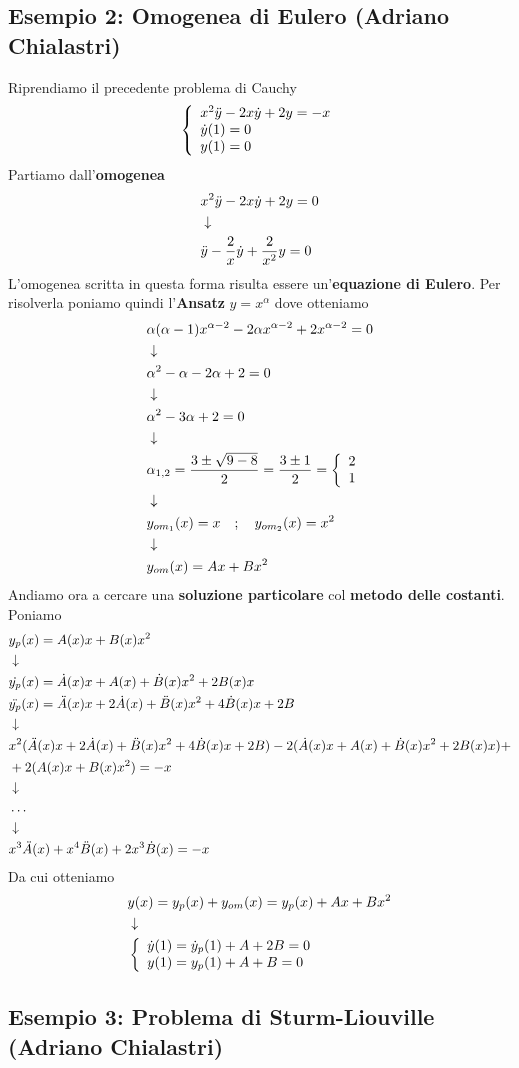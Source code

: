 \subsection{Esempio 2: Omogenea di Eulero (Adriano Chialastri)}
Riprendiamo il precedente problema di Cauchy
\begin{align}
	\triple{x^2 \ddot{y} - 2x \dot{y} + 2y = -x}{\dot{y}(1)=0\hfill}{y(1)=0\hfill}
\end{align}
Partiamo dall'\textbf{omogenea}
\begin{align}
	&x^2 \ddot{y} - 2x\dot{y} + 2y = 0 \\ &\downarrow \nonumber \\
	&\ddot{y} - \frac{2}{x}\dot{y} + \frac{2}{x^2}y = 0
\end{align}
L'omogenea scritta in questa forma risulta essere un'\textbf{equazione di Eulero}. Per risolverla poniamo quindi l'\textbf{Ansatz} $y=x^\alpha$ dove otteniamo
\begin{align}
	&\alpha(\alpha -1) x^{\alpha-2} - 2 \alpha x^{\alpha-2} + 2x^{\alpha-2} = 0 \\ &\downarrow \nonumber \\
	&\alpha^2 - \alpha - 2\alpha +2 =0 \nonumber \\ &\downarrow \nonumber \\
	&\alpha^2 - 3\alpha +2 =0 \nonumber \\ &\downarrow \nonumber \\
	&\alpha_{1,2} = \frac{3 \pm \sqrt{9-8}}{2} = \frac{3\pm 1}{2} = \left\{ \begin{array}{cc} 2\\ 1 \end{array} \right. \nonumber \\ &\downarrow \nonumber \\
	&y_{{om}_1}(x) = x \quad ; \quad y_{{om}_2}(x) = x^2 \nonumber \\ &\downarrow \nonumber \\
	&y_{om}(x) = Ax + Bx^2   
\end{align}
Andiamo ora a cercare una \textbf{soluzione particolare} col \textbf{metodo delle costanti}. Poniamo
\begin{align}
	&y_p(x) = A(x)x + B(x)x^2 \\ &\downarrow \nonumber \\
	&\dot{y_p}(x)  = \dot{A}(x)x+ A(x) + \dot{B}(x) x^2 + 2B(x)x\\
	&\ddot{y_p}(x) = \ddot{A}(x)x+ 2\dot{A}(x) + \ddot{B}(x) x^2 + 4\dot{B}(x)x + 2B  \\ &\downarrow \nonumber \\
	&x^2 (\ddot{A}(x)x+ 2\dot{A}(x) + \ddot{B}(x) x^2 + 4\dot{B}(x)x + 2B) -2 (\dot{A}(x)x+ A(x) + \dot{B}(x) x^2 + 2B(x)x) + \nonumber \\
	&+2(A(x)x + B(x)x^2) = -x  \nonumber \\ &\downarrow \nonumber \\
	&\dots \nonumber \\ &\downarrow \nonumber \\
	&x^3 \ddot{A}(x) + x^4 \ddot{B}(x) + 2x^3 \dot{B}(x) = -x
\end{align}
Da cui otteniamo
\begin{align}
	&y(x) = y_p(x) + y_{om}(x) = y_p(x) + Ax + Bx^2 \firstpassage
	&\double{\dot{y}(1) = \dot{y}_p(1) + A + 2B = 0}{y(1) = y_p(1) + A + B=0\hfill}
\end{align}

\newpage

\subsection{Esempio 3: Problema di Sturm-Liouville (Adriano Chialastri)}

